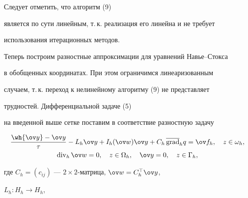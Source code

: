 Следует отметить, что алгоритм (9)


является по сути линейным, т.\,к. реализация его линейна и не требует


использования итерационных методов.





Теперь построим разностные аппроксимации для уравнений Навье--Стокса


в обобщенных координатах. При этом ограничимся линеаризованным


случаем, т.\,к. переход к нелинейному алгоритму (9) не представляет 


трудностей. Дифференциальной задаче (5)


на введенной выше сетке поставим в соответствие разностную задачу


\begin{gather}


\frac{{\wh {\ov y}}-\ov y}{\tau} - L_h\ov y+I_h(\ov w)\ov


y+C_h\,\overline{\grad}_h q=\ov f_h,\quad z\in\omega_h,\\


%


\Div_h\ov w=0,\quad z\in\Omega_h,\quad \ov y=0,\quad z\in\Gamma_h,


\end{gather}


где $C_h=(c_{ij})$ --- $2\times 2$-матрица, $\ov w=C_h^\top\ov y$,


$L_h:H_h\to H_h$,


